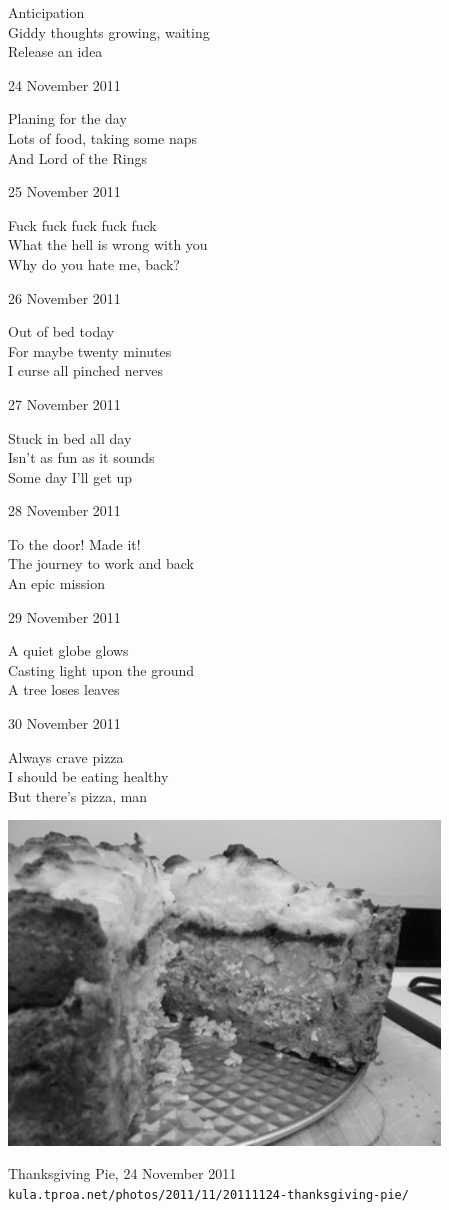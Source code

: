 \documentclass[12pt]{article}
\begin{document}
Anticipation \\
Giddy thoughts growing, waiting \\
Release an idea

\newpage

24 November 2011

Planing for the day \\
Lots of food, taking some naps \\
And Lord of the Rings

25 November 2011

Fuck fuck fuck fuck fuck \\
What the hell is wrong with you \\
Why do you hate me, back?

26 November 2011

Out of bed today \\
For maybe twenty minutes \\
I curse all pinched nerves

27 November 2011

Stuck in bed all day \\
Isn't as fun as it sounds \\
Some day I'll get up

28 November 2011

To the door! Made it! \\
The journey to work and back \\
An epic mission

29 November 2011

A quiet globe glows \\
Casting light upon the ground \\
A tree loses leaves

30 November 2011

Always crave pizza \\
I should be eating healthy \\
But there's pizza, man


\newpage

\begin{center}
\includegraphics[width=325pt]{tday-pie.png}

Thanksgiving Pie, 24 November 2011 \\
{\tt kula.tproa.net/photos/2011/11/20111124-thanksgiving-pie/ }
\end{center}
\end{document}
